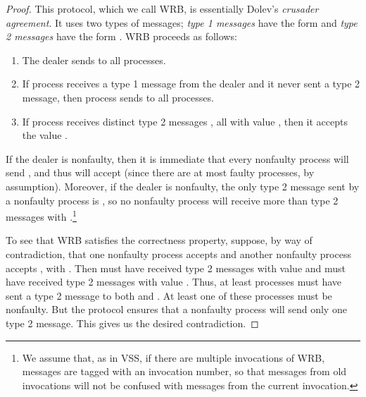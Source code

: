 \documentclass{sig-alternate}
\begin{document}
\begin{proof}
This protocol, which we call WRB, is essentially Dolev's \citeyear{D82}
\emph{crusader agreement}.
It uses two types of messages; \emph{type 1 messages} have
the form  and \emph{type 2 messages} have the form .
WRB proceeds as follows:
\begin{enumerate}
\item The dealer sends  to all processes.
\item  If process  receives a type 1 message  from the
dealer and it never sent a type 2 message, then process  sends
 to all processes.
\item If process  receives   distinct type 2 messages
, all with value ,
then it accepts the value .
\end{enumerate}

If the dealer is nonfaulty, then
it is immediate that every nonfaulty process will send , and thus
will accept  (since there are at most  faulty processes, by
assumption).
Moreover, if the dealer is nonfaulty,
the only type 2 message sent by a nonfaulty process is , so no
nonfaulty process will receive more than  type 2 messages  with .\footnote{We assume that,
as in VSS,
if there are multiple invocations of WRB,
messages are tagged with an invocation number,
so that messages from old invocations will not be confused with messages
from the current invocation.}


To see that WRB satisfies the correctness property,
suppose, by way of contradiction, that one nonfaulty process  accepts 
and another nonfaulty process  accepts , with .  Then
 must have received  type 2 messages with value  and 
must have received  type 2 messages with value .
Thus, at least  processes must have sent a type 2
message to both  and .
At least one of these processes must be
nonfaulty.  But the protocol ensures that a nonfaulty process will send only
one type 2 message.  This gives us the desired contradiction.
\end{proof}
\end{document}
